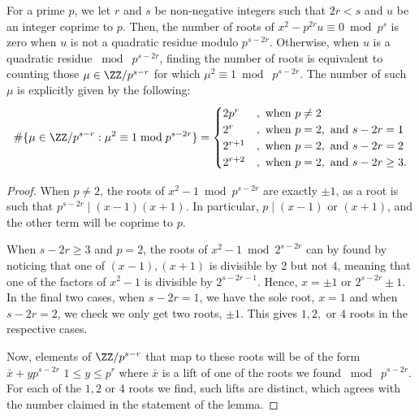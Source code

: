 \documentclass[11pt, proquest]{uwthesis}
\begin{document}
     \begin{lemma}\label{Lem:pLiftRoots}
    For a prime $p$, we let $r$ and $s$ be non-negative integers such that $2r < s$ and $u$ be an integer coprime to $p$.
    Then, the number of roots of $x^2 - p^{2r}u \equiv 0\bmod p^s$ is zero when $u$ is not a quadratic residue modulo $p^{s-2r}$.
    Otherwise, when $u$ is a quadratic residue $\bmod\; p^{s-2r}$, finding the number of roots is equivalent to counting those $\mu\in \ZZ/p^{s-r}$ for which $\mu^2 \equiv 1\bmod\; p^{s-2r}$.
    The number of such $\mu$ is explicitly given by the following:
    \[
      \#\{\mu\in \ZZ/p^{s-r} : \mu^2 \equiv 1 \bmod p^{s-2r}\} = \begin{cases}
        2p^{r}    & , \text{ when } p\ne 2                          \\
        2^{r}     & , \text{ when } p=2, \text{ and } s-2r=1     \\
        2^{r + 1} & , \text{ when } p=2, \text{ and } s-2r=2     \\
        2^{r + 2} & , \text{ when } p=2, \text{ and } s-2r\geq3.
      \end{cases}
    \]
  \end{lemma}
\begin{proof}
When $p\ne 2$, the roots of $x^2-1\bmod p^{s-2r}$ are exactly $\pm 1$, as a root is such that $p^{s-2r}\mid (x-1)(x+1)$. In particular, $p\mid (x-1)$ or $(x+1)$, and the other term will be coprime to $p$.

When ${s-2r}\geq 3$ and $p = 2$, the roots of $x^2-1\bmod 2^{s-2r}$ can by found by noticing that one of $(x-1),(x+1)$ is divisible by $2$ but not $4$, meaning that one of the factors of $x^2 -1$ is divisible by $2^{{s-2r}-1}$.
Hence, $x = \pm 1$ or $2^{s-2r}\pm 1$.
In the final two cases, when $s-2r=1$, we have the sole root, $x = 1$ and when $s-2r =2$, we check we only get two roots, $\pm 1$.
This gives $1, 2,$ or $4$ roots in the respective cases.

Now, elements of $\ZZ/p^{s-r}$ that map to these roots will be of the form $\bar x + yp^{s-2r}$ $1\leq y\leq p^{r}$ where $\bar x$ is a lift of one of the roots we found $\bmod\; p^{s-2r}$.
For each of the $1,2$ or $4$ roots we find, such lifts are distinct, which agrees with the number claimed in the statement of the lemma.
\end{proof}
\end{document}
